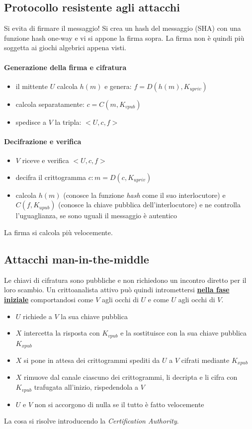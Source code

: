\subsection{Protocollo resistente agli attacchi}
Si evita di firmare il messaggio!
Si crea un hash del messaggio (SHA) con una funzione hash one-way e vi si appone la firma sopra.
La firma non è quindi più soggetta ai giochi algebrici appena visti.
\paragraph{Generazione della firma e cifratura}
\begin{itemize}
    \item il mittente $U$ calcola $h(m)$ e genera:
    $ f = D(h(m), K_{upriv})$
    \item calcola separatamente:
    $c = C(m, K_{vpub}) $
    \item spedisce a $V$ la tripla: $<U, c, f>$
\end{itemize}
\paragraph{Decifrazione e verifica}
\begin{itemize}
    \item $V$ riceve e verifica $<U, c, f>$
    \item decifra il crittogramma $c: m = D(c, K_{upriv})$
    \item calcola $h(m)$ (conosce la funzione \emph{hash} come il suo interlocutore) e $C(f, K_{upub})$ (conosce la chiave pubblica dell'interlocutore) e ne controlla l'uguaglianza, se sono uguali il messaggio è autentico
\end{itemize}
La firma si calcola più velocemente.

\subsection{Attacchi man-in-the-middle}
Le chiavi di cifratura sono pubbliche e non richiedono un incontro diretto per il loro scambio.
Un crittoanalista attivo può quindi intromettersi \textbf{\underline{nella fase iniziale}} comportandosi come $V$ agli occhi di $U$ e come $U$ agli occhi di $V$.
\begin{itemize}
    \item $U$ richiede a $V$ la sua chiave pubblica
    \item $X$ intercetta la risposta con $K_{vpub}$ e la sostituisce con la sua chiave pubblica $K_{xpub}$
    \item $X$ si pone in attesa dei crittogrammi spediti da $U$ a $V$ cifrati mediante $K_{xpub}$
    \item $X$ rimuove dal canale ciascuno dei crittogrammi, li decripta e li cifra con $K_{vpub}$ trafugata all'inizio, rispedendola a $V$
    \item $U$ e $V$ non si accorgono di nulla se il tutto è fatto velocemente
\end{itemize}
La cosa si risolve introducendo la \emph{Certification Authority}.

